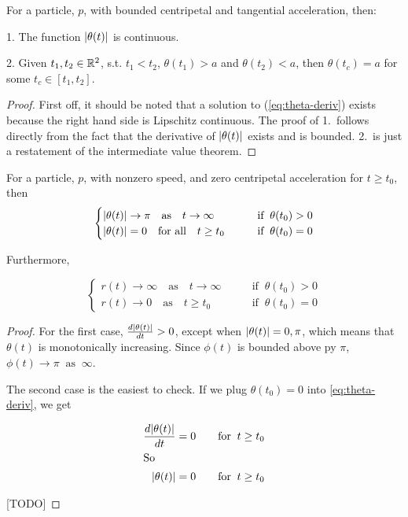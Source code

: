 \begin{lemma}\label{lemma:intermediate-theta}
  For a particle, $p$, with bounded centripetal and tangential acceleration, then: 

  1. The function $\abs{\theta(t)}$ is continuous. 

  2. Given $t_1, t_2 \in \mathbb R^2$, s.t. $t_1 < t_2$, $\theta(t_1) > a$ and $\theta(t_2) < a$, then $\theta(t_c) = a$ for some $t_c \in [t_1, t_2]$.
\end{lemma}

\begin{proof}
First off, it should be noted that a solution to (\ref{eq:theta-deriv}) exists because the right hand side is Lipschitz continuous. The proof of 1.\ follows directly from the fact that the derivative of $\abs{\theta(t)}$ exists and is bounded. 2.\ is just a restatement of the intermediate value theorem.
\end{proof}

\begin{lemma}\label{lemma:polar-assymptote}
  For a particle, $p$, with nonzero speed, and zero centripetal acceleration for $t \ge t_0$, then
  \[
    \begin{cases}
      \abs{\theta(t)} \to \pi \quad \text{as} \quad t \to \infty \qquad &\text{if} \;\; \theta(t_0) > 0\\
      \abs{\theta(t)} = 0 \quad \text{for all} \quad t \ge t_0 \qquad &\text{if} \;\; \theta(t_0) = 0
    \end{cases}
  \]

    Furthermore,

  \[
    \begin{cases}
      r(t) \to \infty \quad \text{as} \quad t \to \infty \qquad &\text{if} \;\; \theta(t_0) > 0\\
      r(t) \to 0 \quad \text{as} \quad t \ge t_0 \qquad &\text{if} \;\; \theta(t_0) = 0
    \end{cases}
  \]
\end{lemma}

\begin{proof}

For the first case, $\frac{d\abs{\theta(t)}}{dt} > 0$, except when $\abs{\theta(t)} = 0, \pi$, which means that $\theta(t)$ is monotonically increasing. Since $\phi(t)$ is bounded above py $\pi$, $\phi(t) \to \pi \;\; \text{as} \;\; \infty$.

The second case is the easiest to check. If we plug $\theta(t_0) = 0$ into \ref{eq:theta-deriv}, we get

\begin{align*}
\frac{d\abs{\theta(t)}}{dt} = 0 \qquad \text{for} \;\; t \ge t_0\\
\intertext{So}
\abs{\theta(t)} = 0 \qquad \text{for} \;\; t \ge t_0
\end{align*}

[TODO]

\end{proof}
